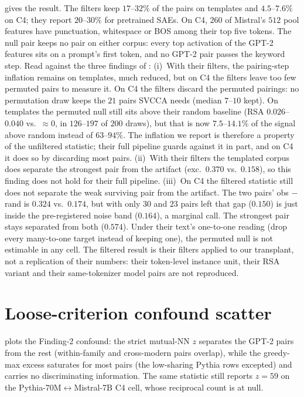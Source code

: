  gives the result. The filters keep $17$--$32\%$ of the pairs on templates
and $4.5$--$7.6\%$ on C4; they report $20$--$30\%$ for pretrained SAEs. On C4, $260$ of
Mistral's $512$ pool features have punctuation, whitespace or BOS among their top five tokens. The
null pair keeps no pair on either corpus: every top activation of the GPT-2 features sits on a
prompt's first token, and no GPT-2 pair passes the keyword step. Read against the
three findings of :
(i)~With their filters, the pairing-step inflation remains on templates, much reduced, but on C4
the filters leave too few permuted pairs to measure it. On C4 the filters discard
the permuted pairings: no permutation draw keeps the $21$ pairs SVCCA needs (median $7$--$10$
kept). On templates the permuted null still sits above their random baseline (RSA
$0.026$--$0.040$ vs.\ ${\approx}0$, in $126$--$197$ of $200$ draws), but that is now
$7.5$--$14.1\%$ of the signal above random instead of $63$--$94\%$. The inflation we report is
therefore a property of the unfiltered statistic; their full pipeline guards against it in
part, and on C4 it does so by discarding most pairs.
(ii)~With their filters the templated corpus does separate the strongest pair from the
artifact (exc.\ $0.370$ vs.\ $0.158$), so this finding does not hold for their full pipeline.
(iii)~On C4 the filtered statistic still does not separate the weak surviving pair from the
artifact. The two pairs' obs $-$ rand is $0.324$ vs.\ $0.174$, but with only $30$ and $23$
pairs left that gap ($0.150$) is just inside the pre-registered noise band ($0.164$), a marginal
call. The strongest pair stays
separated from both ($0.574$).
Under their text's one-to-one reading (drop every many-to-one target instead of keeping one),
the permuted null is not estimable in any cell. The filtered result is their filters applied to
our transplant, not a replication of their numbers: their token-level instance unit, their
RSA variant and their same-tokenizer model pairs are not reproduced.



\section{Loose-criterion confound scatter}\label{app:greedy_scatter}

 plots the Finding-2 confound: the strict mutual-NN $z$ separates the
GPT-2 pairs from the rest (within-family and cross-modern pairs overlap), while the greedy-max excess saturates for most pairs (the low-sharing
Pythia rows excepted) and carries no discriminating information. The same statistic still reports $z=59$ on the Pythia-70M$\leftrightarrow$Mistral-7B C4 cell, whose reciprocal count is at null.

